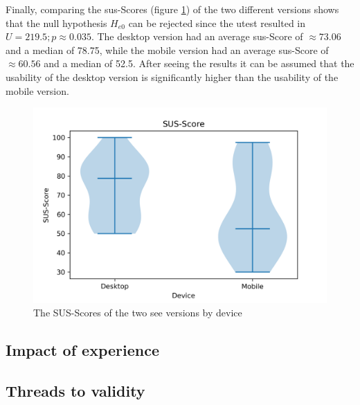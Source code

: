 Finally, comparing the \gls{sus}-Scores (figure \ref{fig:sus-vio}) of the two different versions shows that the null hypothesis $H_{e0}$ can be rejected since the \gls{utest} resulted in $U = 219.5; p \approx 0.035$.
The desktop version had an average \gls{sus}-Score of $\approx 73.06$ and a median of 78.75, while the mobile version had an average \gls{sus}-Score of $\approx 60.56$ and a median of 52.5. 
After seeing the results it can be assumed that the \gls{usability} of the desktop version is significantly higher than the \gls{usability} of the mobile version.
\begin{figure}[htb]
  \centering
  \includegraphics[width=1\textwidth]{Evaluation/img/SUS-Score_violin.png}
  \caption{The SUS-Scores of the two \gls{see} versions by device}\label{fig:sus-vio}
\end{figure}

\subsection{Impact of experience}
\subsection{Threads to validity}
\label{sec:validity}